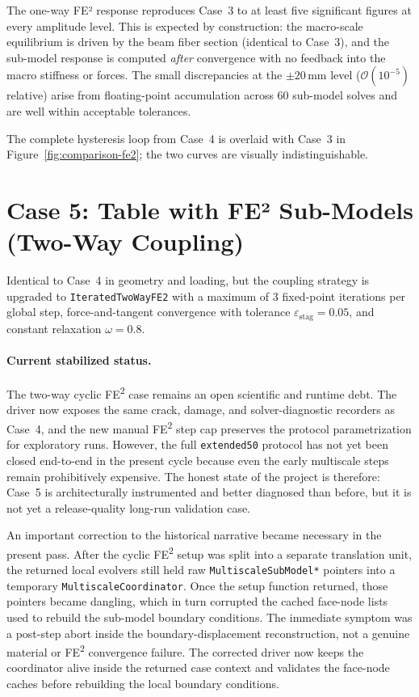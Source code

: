 \noindent
The one-way FE² response reproduces Case~3 to at least five
significant figures at every amplitude level.  This is expected
by construction: the macro-scale equilibrium is driven by
the beam fiber section (identical to Case~3), and the sub-model
response is computed \emph{after} convergence with no feedback
into the macro stiffness or forces.  The small discrepancies at
the $\pm 20$\,mm level ($\mathcal{O}(10^{-5})$ relative) arise
from floating-point accumulation across 60 sub-model solves and
are well within acceptable tolerances.

The complete hysteresis loop from Case~4 is overlaid with Case~3
in Figure~\ref{fig:comparison-fe2}; the two curves are visually
indistinguishable.


\section{Case 5: Table with FE² Sub-Models (Two-Way Coupling)}
\label{sec:cyclic-case5}

Identical to Case~4 in geometry and loading, but the coupling
strategy is upgraded to \texttt{IteratedTwoWayFE2} with a maximum of
3 fixed-point iterations per global step, force-and-tangent
convergence with tolerance $\varepsilon_{\text{stag}} = 0.05$, and
constant relaxation $\omega = 0.8$.

\paragraph{Current stabilized status.}
The two-way cyclic FE\textsuperscript{2} case remains an open scientific and
runtime debt.  The driver now exposes the same crack, damage, and
solver-diagnostic recorders as Case~4, and the new manual FE\textsuperscript{2}
step cap preserves the protocol parametrization for exploratory runs.
However, the full \texttt{extended50} protocol has not yet been closed
end-to-end in the present cycle because even the early multiscale steps remain
prohibitively expensive.  The honest state of the project is therefore:
Case~5 is architecturally instrumented and better diagnosed than before, but it
is not yet a release-quality long-run validation case.

An important correction to the historical narrative became necessary in the
present pass.  After the cyclic FE\textsuperscript{2} setup was split into a
separate translation unit, the returned local evolvers still held raw
\texttt{MultiscaleSubModel*} pointers into a temporary
\texttt{MultiscaleCoordinator}.  Once the setup function returned, those
pointers became dangling, which in turn corrupted the cached face-node lists
used to rebuild the sub-model boundary conditions.  The immediate symptom was a
post-step abort inside the boundary-displacement reconstruction, not a genuine
material or FE\textsuperscript{2} convergence failure.  The corrected driver
now keeps the coordinator alive inside the returned case context and validates
the face-node caches before rebuilding the local boundary conditions.

